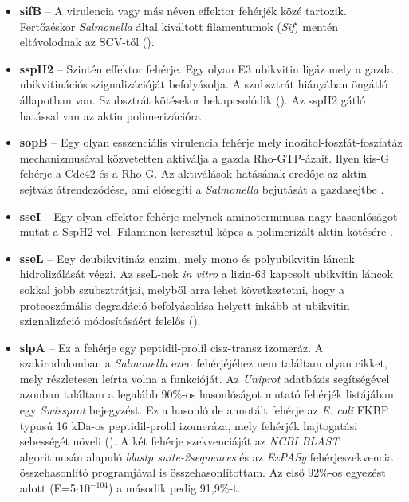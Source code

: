\documentclass[a4paper,12pt]{article}
\begin{document}
		\begin{itemize}
			\item \textbf{sifB} -- A virulencia vagy más néven effektor fehérjék közé tartozik. Fertőzéskor \textit{Salmonella} által kiváltott filamentumok (\textit{Sif}) mentén eltávolodnak az SCV-től (\cite{sifB}). 
			\textit{}
			\item \textbf{sspH2} -- Szintén effektor fehérje. Egy olyan E3 ubikvitin ligáz mely a gazda ubikvitinációs szignalizációját befolyásolja. A szubsztrát hiányában öngátló állapotban van. Szubsztrát kötésekor bekapcsolódik (\cite{ssph2}).  Az sspH2 gátló hatással van az aktin polimerizációra \cite{salmonella_and_host_cell_nature}. 
			
			\item \textbf{sopB} -- Egy olyan esszenciális virulencia fehérje mely inozitol-foszfát-foszfatáz mechanizmusával közvetetten aktiválja a gazda Rho-GTP-ázait. Ilyen kis-G fehérje a Cdc42 és a Rho-G. Az aktiválások hatásának eredője az aktin sejtváz átrendeződése, ami elősegíti a \textit{Salmonella} bejutását a gazdasejtbe \cite{salmonella_and_host_cell_nature}. 
			
			\item \textbf{sseI} -- Egy olyan effektor fehérje melynek aminoterminusa nagy hasonlóságot mutat a SspH2-vel. Filaminon keresztül képes a polimerizált aktin kötésére \cite{salmonella_and_host_cell_nature}. 
			
			\item \textbf{sseL} -- Egy deubikvitináz enzim, mely  mono és polyubikvitin láncok hidrolizálását végzi. Az sseL-nek \textit{in vitro} a lizin-63 kapcsolt ubikvitin láncok sokkal jobb szubsztrátjai, melyből arra lehet következtetni, hogy a proteoszómális degradáció befolyásolása helyett inkább at ubikvitin szignalizáció módosításáért felelős (\cite{sseL}). 
			
			\item \textbf{slpA} -- Ez a fehérje egy peptidil-prolil cisz-transz izomeráz. A szakirodalomban a \textit{Salmonella} ezen fehérjéjéhez nem találtam olyan cikket, mely részletesen leírta volna a funkcióját. Az \textit{Uniprot} adatbázis segítségével azonban találtam a legalább 90\%-os hasonlóságot mutató fehérjék listájában egy \textit{Swissprot} bejegyzést. Ez a hasonló de annotált fehérje az \textit{E. coli} FKBP typusú 16 kDa-os peptidil-prolil izomeráza, mely fehérjék hajtogatási sebességét növeli (\cite{fkbp}).  A két fehérje szekvenciáját az \textit{NCBI BLAST} algoritmusán alapuló \textit{blastp suite-2sequences} és az \textit{ExPASy} fehérjeszekvencia összehasonlító programjával is összehasonlítottam. Az első 92\%-os egyezést adott (E=5$\cdot 10^{-104}$) a második pedig 91,9\%-t.
			
		\end{itemize}
		
\end{document}

